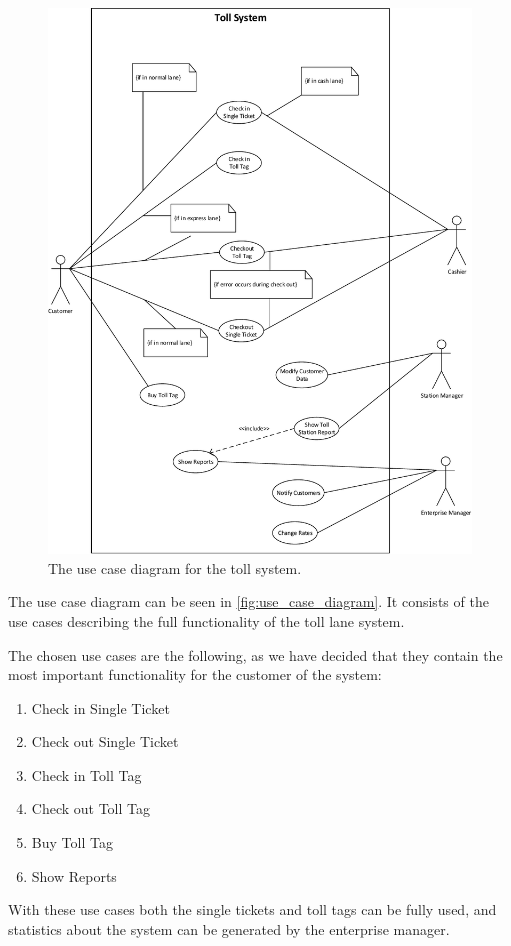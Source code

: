 \begin{figure}
\centering
\includegraphics[width=1\textwidth]{img/use_case_diagram/use_case_diagram}
\caption{The use case diagram for the toll system.}
\label{fig:use_case_diagram}
\end{figure}

The use case diagram can be seen in \autoref{fig:use_case_diagram}. It consists of the use cases describing the full functionality of the toll lane system.

The chosen use cases are the following, as we have decided that they contain the most important functionality for the customer of the system:
\begin{enumerate}
\item Check in Single Ticket
\item Check out Single Ticket
\item Check in Toll Tag
\item Check out Toll Tag
\item Buy Toll Tag
\item Show Reports
\end{enumerate}

With these use cases both the single tickets and toll tags can be fully used, and statistics about the system can be generated by the enterprise manager.
